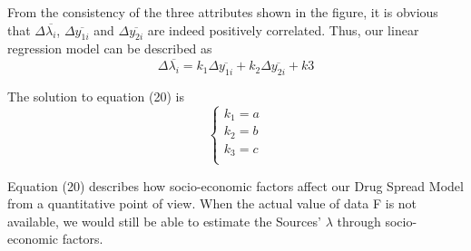 From the consistency of the three attributes shown in the figure, it is obvious that $\Delta \overline{\lambda_i}$, $\Delta \overline{y_{1i}}$ and  $\Delta \overline{y_{2i}}$ are indeed positively correlated. Thus, our linear regression model can be described as
\begin{equation}
\Delta \overline{\lambda_i} = k_1 \Delta \overline{y_{1i}} + k_2 \Delta \overline{y_{2i}} + k3
\end{equation}

The solution to equation (20) is
\begin{equation}
\left\{
\begin{array}{l}
k_1 = a \\
k_2 = b \\
k_3 = c \\
\end{array}
\right.
\end{equation}

Equation (20) describes how socio-economic factors affect our Drug Spread Model from a quantitative point of view. When the actual value of data F is not available, we would still be able to estimate the Sources' $\lambda$ through socio-economic factors.

